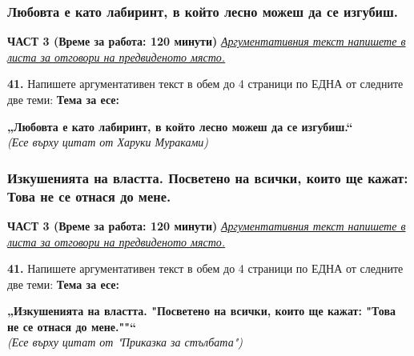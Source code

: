 \documentclass[12pt,a4paper]{article}
\begin{document}
\subsubsection{Любовта е като лабиринт, в който лесно можеш да се изгубиш.}
\vspace{0.5cm}
\begin{center}
\textbf{ЧАСТ 3 (Време за работа: 120 минути)}
\vspace{0.2cm}
{\textit{\underline{Аргументативния текст напишете в листа за отговори на предвиденото място.}}}
\vspace{0.1cm}
\end{center}
\textbf{41.} Напишете аргументативен текст в обем до 4 страници по ЕДНА от следните две теми:
\vspace{0.2cm}
\textbf{Тема за есе:}
\vspace{0.1cm}
\begin{center}
\textbf{„Любовта е като лабиринт, в който лесно можеш да се изгубиш.“}
\\
\textit{(Есе върху цитат от Харуки Мураками)}
\end{center}

\subsubsection{Изкушенията на властта. Посветено на всички, които ще кажат: Това не се отнася до мене.}
\vspace{0.5cm}
\begin{center}
\textbf{ЧАСТ 3 (Време за работа: 120 минути)}
\vspace{0.2cm}
{\textit{\underline{Аргументативния текст напишете в листа за отговори на предвиденото място.}}}
\vspace{0.1cm}
\end{center}
\textbf{41.} Напишете аргументативен текст в обем до 4 страници по ЕДНА от следните две теми:
\vspace{0.2cm}
\textbf{Тема за есе:}
\vspace{0.1cm}
\begin{center}
\textbf{„Изкушенията на властта. "Посветено на всички, които ще кажат: "Това не се отнася до мене."}\textbf{"}\textbf{“}
\\
\textit{(Есе върху цитат от "Приказка за стълбата")}
\end{center}
\end{document}
